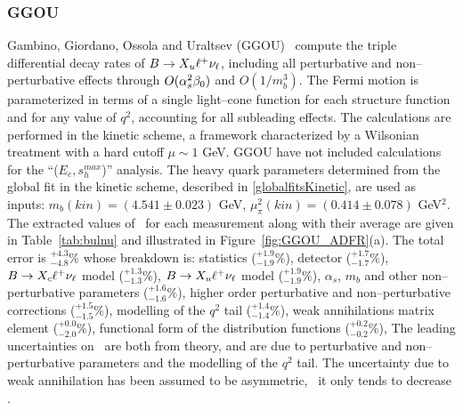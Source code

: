 \subsubsection{GGOU}
Gambino, Giordano, Ossola and Uraltsev (GGOU)~\cite{Gambino:2007rp} 
compute the triple differential decay rates of $B \to X_u \ell^+ \nu_\ell$, 
including all perturbative and non--perturbative effects through $O(\alpha_s^2 \beta_0)$ 
and $O(1/m_b^3)$. 
The Fermi motion is parameterized in terms of a single light--cone function 
for each structure function and for any value of $q^2$, accounting for all subleading effects. 
The calculations are performed in the kinetic scheme, a framework characterized by a Wilsonian 
treatment with a hard cutoff $\mu \sim 1 $ GeV.
GGOU have not included calculations for the ``($E_e,s^{max}_h$)'' analysis. 
The heavy quark parameters determined  
from the global fit in the kinetic scheme, described in \ref{globalfitsKinetic}, are used as inputs: 
$m_b(kin)=(4.541 \pm 0.023)$ GeV, 
$\mu_\pi^2(kin)=(0.414 \pm 0.078)$ GeV$^2$. 
The extracted values
of \vub\, for each measurement along with their average are given in
Table~\ref{tab:bulnu} and illustrated in Figure~\ref{fig:GGOU_ADFR}(a).
The total error is $^{+4.3}_{-4.8}\%$ whose breakdown is:
statistics ($^{+1.9}_{-1.9}\%$),
detector ($^{+1.7}_{-1.7}\%$),
$B\to X_c \ell^+ \nu_\ell$ model ($^{+1.3}_{-1.3}\%$),
$B\to X_u \ell^+ \nu_\ell$ model ($^{+1.9}_{-1.9}\%$),
$\alpha_s$, $m_b$ and other non--perturbative parameters ($^{+1.6}_{-1.6}\%$), 
higher order perturbative and non--perturbative corrections ($^{+1.5}_{-1.5}\%$), 
modelling of the $q^2$ tail
($^{+1.4}_{-1.4}\%$), 
weak annihilations matrix element ($^{+0.0}_{-2.0}\%$), 
functional form of the distribution functions ($^{+0.2}_{-0.2}\%$), 
The leading uncertainties
on  \vub\ are both from theory, and are due to perturbative and non--perturbative
parameters and the modelling of the $q^2$ tail.
The uncertainty due to 
weak annihilation has been assumed to be asymmetric, \ie\ it only tends to decrease \vub.


